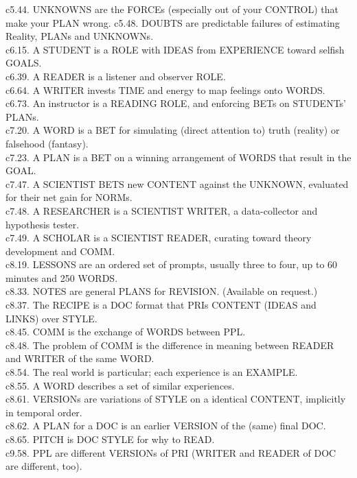 \documentclass[
]{book}
\begin{document}
c5.44. UNKNOWNS are the FORCEs (especially out of your CONTROL) that make your PLAN wrong.
c5.48. DOUBTS are predictable failures of estimating Reality, PLANs and UNKNOWNs.\\
c6.15. A STUDENT is a ROLE with IDEAS from EXPERIENCE toward selfish GOALS.\\
c6.39. A READER is a listener and observer ROLE.\\
c6.64. A WRITER invests TIME and energy to map feelings onto WORDS.\\
c6.73. An instructor is a READING ROLE, and enforcing BETs on STUDENTs' PLANs.\\
c7.20. A WORD is a BET for simulating (direct attention to) truth (reality) or falsehood (fantasy).\\
c7.23. A PLAN is a BET on a winning arrangement of WORDS that result in the GOAL.\\
c7.47. A SCIENTIST BETS new CONTENT against the UNKNOWN, evaluated for their net gain for NORMs.\\
c7.48. A RESEARCHER is a SCIENTIST WRITER, a data-collector and hypothesis tester.\\
c7.49. A SCHOLAR is a SCIENTIST READER, curating toward theory development and COMM.\\
c8.19. LESSONS are an ordered set of prompts, usually three to four, up to 60 minutes and 250 WORDS.\\
c8.33. NOTES are general PLANS for REVISION. (Available on request.)\\
c8.37. The RECIPE is a DOC format that PRIs CONTENT (IDEAS and LINKS) over STYLE.\\
c8.45. COMM is the exchange of WORDS between PPL.\\
c8.48. The problem of COMM is the difference in meaning between READER and WRITER of the same WORD.\\
c8.54. The real world is particular; each experience is an EXAMPLE.\\
c8.55. A WORD describes a set of similar experiences.\\
c8.61. VERSIONs are variations of STYLE on a identical CONTENT, implicitly in temporal order.\\
c8.62. A PLAN for a DOC is an earlier VERSION of the (same) final DOC.\\
c8.65. PITCH is DOC STYLE for why to READ.\\
c9.58. PPL are different VERSIONs of PRI (WRITER and READER of DOC are different, too).

\hypertarget{appendix-appendix-lessons}{%
\appendix}
\end{document}
